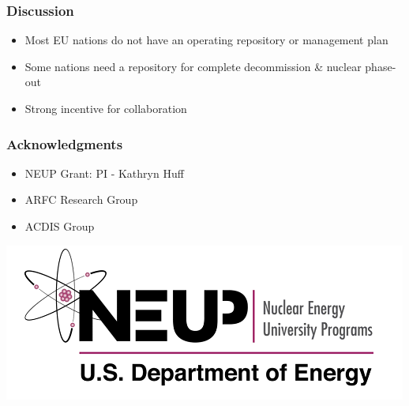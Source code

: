 \begin{frame}
	\frametitle{Discussion}
	\begin{itemize}
		\item Most EU nations do not have an operating repository or management plan
		\item Some nations need a repository for complete decommission \& nuclear phase-out	
		\item Strong incentive for collaboration
	\end{itemize}
\end{frame}

\begin{frame}
    \frametitle{Acknowledgments}
    \begin{itemize}
        \item NEUP Grant: PI - Kathryn Huff
        \item \gls{ARFC} Research Group
        \item \gls{ACDIS} Group
    \end{itemize}
    \begin{center}
        \includegraphics[width=\textwidth]{./images/neup.png}
    \end{center}
\end{frame}